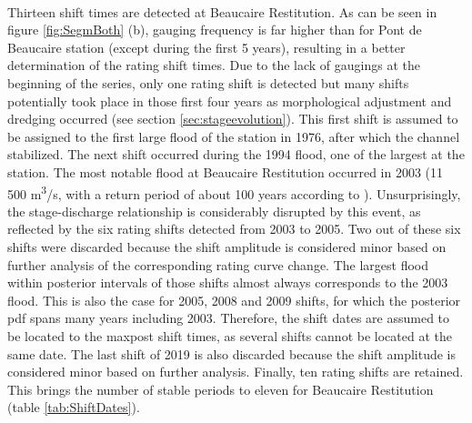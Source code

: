     \paragraph{}    
    Thirteen shift times are detected at Beaucaire Restitution. As can be seen in figure \ref{fig:SegmBoth} (b), gauging frequency is far higher than for Pont de Beaucaire station (except during the first 5 years), resulting in a better determination of the rating shift times. 
    Due to the lack of gaugings at the beginning of the series, only one rating shift is detected but many shifts potentially took place in those first four years as morphological adjustment and dredging occurred (see section \ref{sec:stageevolution}). This first shift is assumed to be assigned to the first large flood of the station in 1976, after which the channel stabilized. The next shift occurred during the 1994 flood, one of the largest at the station. The most notable flood at Beaucaire Restitution occurred in 2003 (11 500 m\textsuperscript{3}/s, with a return period of about 100 years according to \citet{medd_debit_2005}). Unsurprisingly, the stage-discharge relationship is considerably disrupted by this event, as reflected by the six rating shifts detected from 2003 to 2005. Two out of these six shifts were discarded because the shift amplitude is considered minor based on further analysis of the corresponding rating curve change. The largest flood within posterior intervals of those shifts almost always corresponds to the 2003 flood. This is also the case for 2005, 2008 and 2009 shifts, for which the posterior pdf spans many years including 2003. Therefore, the shift dates are assumed to be located to the maxpost shift times, as several shifts cannot be located at the same date. The last shift of 2019 is also discarded because the shift amplitude is considered minor based on further analysis. Finally, ten rating shifts are retained. This brings the number of stable periods to eleven for Beaucaire Restitution (table \ref{tab:ShiftDates}). 
    \FloatBarrier

